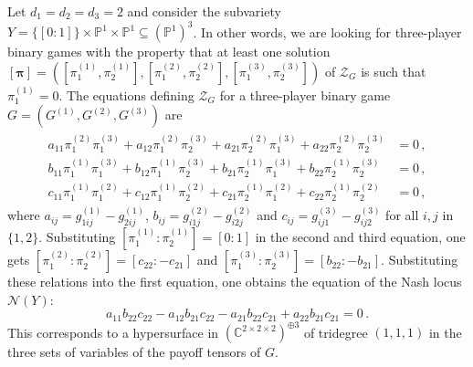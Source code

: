 \documentclass[12pt]{article}
\theoremstyle{definition}
\newenvironment{example}
{\pushQED{\qed}\renewcommand{\qedsymbol}{$\diamond$}\examplex}
{\popQED\endexamplex}
\newcommand{\C}{{\mathbb C}}
\newcommand{\PP}{{\mathbb P}}
\def\bpi{{\boldsymbol{\pi}}}
\newcommand{\kn}{{\mathcal N}}
\newcommand{\kz}{{\mathcal Z}}
\begin{document}
\begin{example}
Let $d_1=d_2=d_3=2$ and consider the subvariety $Y=\{[0:1]\}\times\PP^1\times\PP^1\subseteq(\PP^1)^3$. In other words, we are looking for three-player binary games with the property that at least one solution $[\bpi]=([\pi_1^{(1)},\pi_2^{(1)}],[\pi_1^{(2)},\pi_2^{(2)}],[\pi_1^{(3)},\pi_2^{(3)}])$ of $\kz_G$ is such that $\pi_1^{(1)}=0$.
The equations defining $\kz_G$ for a three-player binary game $G=(G^{(1)},G^{(2)},G^{(3)})$ are
\begin{align}
    \begin{split}
        a_{11}\pi_1^{(2)}\pi_1^{(3)}+a_{12}\pi_1^{(2)}\pi_2^{(3)}+a_{21}\pi_2^{(2)}\pi_1^{(3)}+a_{22}\pi_2^{(2)}\pi_2^{(3)} &= 0\,,\\
        b_{11}\pi_1^{(1)}\pi_1^{(3)}+b_{12}\pi_1^{(1)}\pi_2^{(3)}+b_{21}\pi_2^{(1)}\pi_1^{(3)}+b_{22}\pi_2^{(1)}\pi_2^{(3)} &= 0\,,\\
        c_{11}\pi_1^{(1)}\pi_1^{(2)}+c_{12}\pi_1^{(1)}\pi_2^{(2)}+c_{21}\pi_2^{(1)}\pi_1^{(2)}+c_{22}\pi_2^{(1)}\pi_2^{(2)} &= 0\,,
    \end{split}
\end{align}
where $a_{ij}=g_{1ij}^{(1)}-g_{2ij}^{(1)}$, $b_{ij}=g_{i1j}^{(2)}-g_{i2j}^{(2)}$ and $c_{ij}=g_{ij1}^{(3)}-g_{ij2}^{(3)}$ for all $i,j$ in $\{1,2\}$. Substituting $[\pi_1^{(1)}:\pi_2^{(1)}]=[0:1]$ in the second and third equation, one gets $[\pi_1^{(2)}:\pi_2^{(2)}]=[c_{22}:-c_{21}]$ and $[\pi_1^{(3)}:\pi_2^{(3)}]=[b_{22}:-b_{21}]$. Substituting these relations into the first equation, one obtains the equation of the Nash locus $\kn(Y)$:
\[
    a_{11}b_{22}c_{22}-a_{12}b_{21}c_{22}-a_{21}b_{22}c_{21}+a_{22}b_{21}c_{21}=0\,.
\]
This corresponds to a hypersurface in $(\C^{2\times 2\times 2})^{\oplus 3}$ of tridegree $(1,1,1)$ in the three sets of variables of the payoff tensors of $G$.

\medskip


\end{example}
\end{document}
